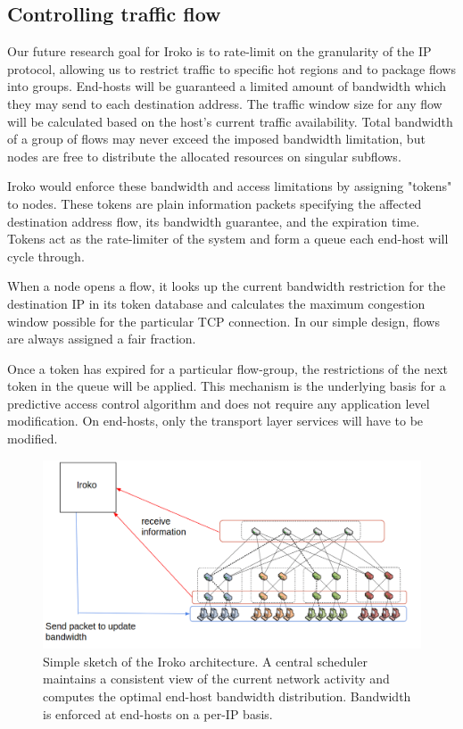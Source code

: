 \subsection{Controlling traffic flow}
Our future research goal for Iroko is to rate-limit on the granularity of the IP protocol, allowing us 
to restrict traffic to specific hot regions and to package flows into groups.
End-hosts will be guaranteed a limited amount of bandwidth which they may send to 
each destination address. The traffic window size for any flow will be calculated 
based on the host's current traffic availability. Total bandwidth of a group of 
flows may never exceed the imposed bandwidth limitation, but nodes are free to 
distribute the allocated resources on singular subflows.

Iroko would enforce these bandwidth and access limitations by assigning "tokens" to nodes. These tokens are plain information packets 
specifying the affected destination address flow, its bandwidth guarantee, and 
the expiration time. Tokens act as the rate-limiter of the system and form a 
queue each end-host will cycle through.

When a node opens a flow, it looks up the current bandwidth restriction for 
the destination IP in its token database and calculates the maximum congestion 
window possible for the particular TCP connection. In our simple design, flows 
are always assigned a fair fraction.

Once a token has expired for a particular flow-group, the restrictions of the 
next token in the queue will be applied. This mechanism is the underlying basis 
for a predictive access control algorithm and does not require any application 
level modification. On end-hosts, only the transport layer services will have 
to be modified.

\begin{figure}
\centering
\includegraphics[width=1\linewidth]{Iroko}
\caption{Simple sketch of the Iroko architecture. A central scheduler maintains 
a consistent view of the current network activity and computes the optimal 
end-host bandwidth distribution. Bandwidth is enforced at end-hosts on a per-IP 
basis.}
\label{fig:Topology3}
\end{figure}



